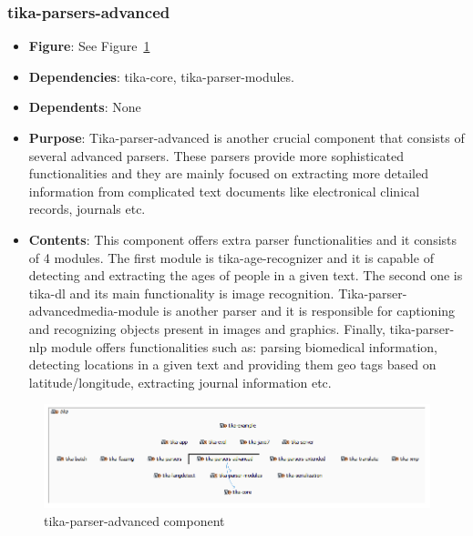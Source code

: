 \documentclass{article}
\begin{document}
\subsubsection{tika-parsers-advanced}
\begin {itemize}
\item \textbf{Figure}: See Figure~\ref{fig:tika-parser-advanced}
\item \textbf{Dependencies}: tika-core, tika-parser-modules.
\item \textbf{Dependents}:  None
\item \textbf{Purpose}: Tika-parser-advanced is another crucial component that consists of several advanced parsers. These parsers provide more sophisticated functionalities and they are mainly focused on extracting more detailed information from complicated text documents like electronical clinical records, journals etc. 
\item \textbf{Contents}: This component offers extra parser functionalities and it consists of 4 modules. The first module is tika-age-recognizer and it is capable of detecting and extracting the ages of people in a given text. The second one is tika-dl and its main functionality is image recognition. Tika-parser-advancedmedia-module is another parser and it is responsible for captioning and recognizing objects present in images and graphics.  Finally, tika-parser-nlp module offers functionalities such as: parsing biomedical information, detecting locations in a given text and providing them geo tags based on latitude/longitude, extracting journal information etc.
\end{itemize}
\begin{figure}[ht]
    \centering
    \includegraphics[width=1\textwidth]{report/images/tika-parser-advanced.PNG}
    \caption{tika-parser-advanced component}
    \label{fig:tika-parser-advanced}
\end{figure}
\end{document}
